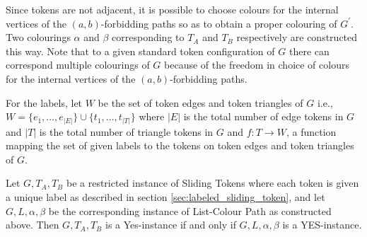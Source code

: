 Since tokens are not adjacent, it is possible to choose colours for the internal vertices of the $(a, b)$-forbidding paths so as to
obtain a proper colouring of $G^{'}$. Two colourings $\alpha$ and $\beta$ corresponding to $T_{A}$ and $T_{B}$ respectively are constructed
this way. Note that to a given standard token configuration of $G$ there can correspond multiple colourings of $G$ because of the freedom
in choice of colours for the internal vertices of the $(a, b)$-forbidding paths.

For the labels, let $W$ be the set of token edges and token triangles of $G$ i.e., $W = \{e_1,\dots, e_{|E|} \} \cup \{t_1,\dots, t_{|T|} \}$
where $|E|$ is the total number of edge tokens in $G$ and $|T|$ is the total number of triangle tokens in $G$
and $f: T \rightarrow W$, a function mapping the set of given labels to the tokens on token edges and token triangles of $G$.


\begin{claim} Let $G, T_A, T_B$ be a restricted instance of Sliding Tokens where each token is given a unique label as described in
section \ref{sec:labeled_sliding_token}, and let $G , L, \alpha, \beta$ be the corresponding instance of List-Colour Path as constructed above.
Then $G, T_A, T_B$ is a Yes-instance if and only if $G , L, \alpha, \beta$ is a YES-instance.
\end{claim}\label{theorem:labeled_sliding}

